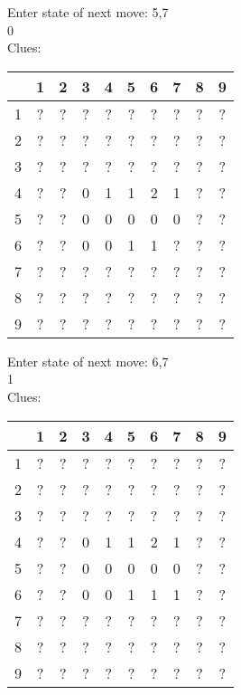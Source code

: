 Enter state of next move: 5,7\\
0\\
Clues:\\
\begin{tabular}{|c|c|c|c|c|c|c|c|c|c|}
\hline
  & 1 & 2 & 3 & 4 & 5 & 6 & 7 & 8 & 9\\
\hline
1 & ? & ? & ? & ? & ? & ? & ? & ? & ?\\
\hline
2 & ? & ? & ? & ? & ? & ? & ? & ? & ?\\
\hline
3 & ? & ? & ? & ? & ? & ? & ? & ? & ?\\
\hline
4 & ? & ? & 0 & 1 & 1 & 2 & 1 & ? & ?\\
\hline
5 & ? & ? & 0 & 0 & 0 & 0 & 0 & ? & ?\\
\hline
6 & ? & ? & 0 & 0 & 1 & 1 & ? & ? & ?\\
\hline
7 & ? & ? & ? & ? & ? & ? & ? & ? & ?\\
\hline
8 & ? & ? & ? & ? & ? & ? & ? & ? & ?\\
\hline
9 & ? & ? & ? & ? & ? & ? & ? & ? & ?\\
\hline
\end{tabular}

Enter state of next move: 6,7\\
1\\
Clues:\\
\begin{tabular}{|c|c|c|c|c|c|c|c|c|c|}
\hline
  & 1 & 2 & 3 & 4 & 5 & 6 & 7 & 8 & 9\\
\hline
1 & ? & ? & ? & ? & ? & ? & ? & ? & ?\\
\hline
2 & ? & ? & ? & ? & ? & ? & ? & ? & ?\\
\hline
3 & ? & ? & ? & ? & ? & ? & ? & ? & ?\\
\hline
4 & ? & ? & 0 & 1 & 1 & 2 & 1 & ? & ?\\
\hline
5 & ? & ? & 0 & 0 & 0 & 0 & 0 & ? & ?\\
\hline
6 & ? & ? & 0 & 0 & 1 & 1 & 1 & ? & ?\\
\hline
7 & ? & ? & ? & ? & ? & ? & ? & ? & ?\\
\hline
8 & ? & ? & ? & ? & ? & ? & ? & ? & ?\\
\hline
9 & ? & ? & ? & ? & ? & ? & ? & ? & ?\\
\hline
\end{tabular}

